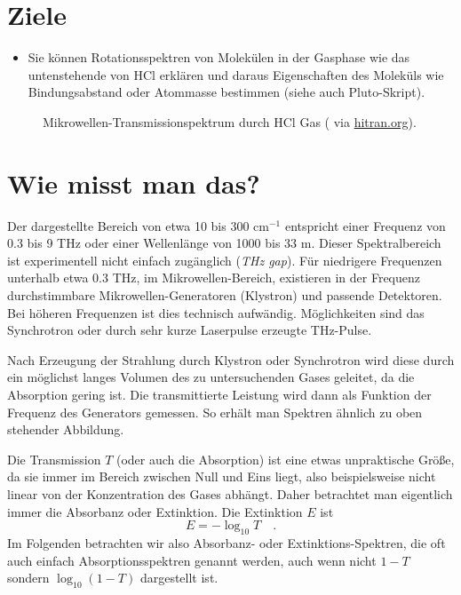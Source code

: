 \section{Ziele}

\begin{itemize}
\item Sie können Rotationsspektren von Molekülen in der Gasphase wie das untenstehende von HCl erklären und daraus Eigenschaften des Moleküls wie Bindungsabstand oder Atommasse bestimmen  (siehe auch Pluto-Skript).
\end{itemize}



\begin{figure}
\caption{Mikrowellen-Transmissionspektrum durch  HCl Gas  (\cite{Li_2011_hcl} via \href{https://hitran.org}{hitran.org}).
\label{fig:rot_hcl}}
\end{figure}



\section{Wie misst man das?}

Der dargestellte Bereich  von etwa 10 bis 300 cm$^{-1}$ entspricht einer Frequenz von 0.3 bis 9 THz oder einer Wellenlänge von 1000 bis 33 \textmu m. Dieser Spektralbereich ist experimentell nicht einfach zugänglich (\emph{THz gap}). Für niedrigere Frequenzen unterhalb etwa 0.3 THz, im Mikrowellen-Bereich, existieren in der Frequenz durchstimmbare  Mikrowellen-Generatoren (Klystron) und passende Detektoren. Bei höheren Frequenzen ist dies technisch aufwändig. Möglichkeiten sind das Synchrotron oder durch sehr kurze Laserpulse erzeugte THz-Pulse.

Nach Erzeugung der Strahlung durch Klystron oder Synchrotron wird diese durch ein möglichst langes Volumen des zu untersuchenden Gases geleitet, da die Absorption gering ist. Die transmittierte Leistung wird dann als Funktion der Frequenz des Generators gemessen. So erhält man  Spektren ähnlich zu oben stehender Abbildung.

Die Transmission $T$ (oder auch die Absorption) ist eine etwas unpraktische Größe, da sie immer im Bereich zwischen Null und Eins liegt, also beispielsweise nicht linear von der Konzentration des Gases abhängt. Daher betrachtet man eigentlich immer die Absorbanz oder Extinktion. Die Extinktion $E$ ist
%
\begin{equation}
 E = - \log_{10} T \quad .
\end{equation}
%
Im Folgenden betrachten wir also Absorbanz- oder Extinktions-Spektren, die oft auch einfach Absorptionsspektren genannt werden, auch wenn nicht $1-T$ sondern $\log_{10} ( 1- T)$ dargestellt ist.

